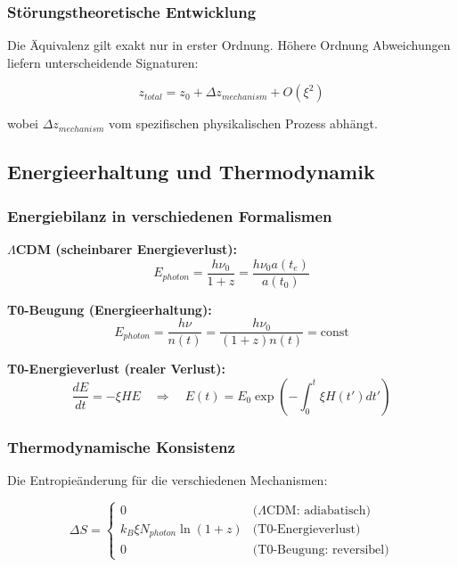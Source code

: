 \documentclass[12pt,a4paper]{article}
\theoremstyle{definition}
\begin{document}
	\subsubsection{St\"orungstheoretische Entwicklung}
	
	Die \"Aquivalenz gilt exakt nur in erster Ordnung. H\"ohere Ordnung Abweichungen liefern unterscheidende Signaturen:
	
	\begin{equation}
		z_{total} = z_0 + \Delta z_{mechanism} + O(\xi^2)
	\end{equation}
	
	wobei $\Delta z_{mechanism}$ vom spezifischen physikalischen Prozess abh\"angt.
	
	\subsection{Energieerhaltung und Thermodynamik}
	\label{subsec:energy_conservation}
	
	\subsubsection{Energiebilanz in verschiedenen Formalismen}
	
	\textbf{$\Lambda$CDM (scheinbarer Energieverlust):}
	\begin{equation}
		E_{photon} = \frac{h\nu_0}{1+z} = \frac{h\nu_0 a(t_e)}{a(t_0)}
	\end{equation}
	
	\textbf{T0-Beugung (Energieerhaltung):}
	\begin{equation}
		E_{photon} = \frac{h\nu}{n(t)} = \frac{h\nu_0}{(1+z)n(t)} = \text{const}
	\end{equation}
	
	\textbf{T0-Energieverlust (realer Verlust):}
	\begin{equation}
		\frac{dE}{dt} = -\xi H E \quad \Rightarrow \quad E(t) = E_0 \exp\left(-\int_0^t \xi H(t') dt'\right)
	\end{equation}
	
	\subsubsection{Thermodynamische Konsistenz}
	
	Die Entropie\"anderung f\"ur die verschiedenen Mechanismen:
	
	\begin{equation}
		\Delta S = \begin{cases}
			0 & \text{($\Lambda$CDM: adiabatisch)} \\
			k_B \xi N_{photon} \ln(1+z) & \text{(T0-Energieverlust)} \\
			0 & \text{(T0-Beugung: reversibel)}
		\end{cases}
	\end{equation}
	
\end{document}
